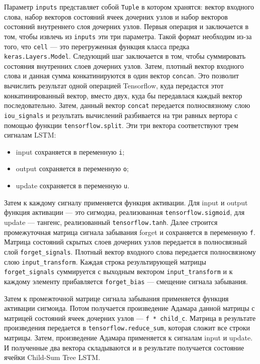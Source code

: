 Параметр \texttt{inputs} представляет собой \texttt{Tuple} в котором хранятся: вектор входного слова, набор векторов состояний ячеек дочерних узлов и набор векторов состояний внутреннего слоя дочерних узлов. Первыя операция и заключается в том, чтобы извлечь из \texttt{inputs} эти три параметра. Такой формат необходим из-за того, что \texttt{cell} --- это перегруженная функция класса предка \texttt{keras.Layers.Model}. Следующий шаг заключается в том, чтобы суммировать состояния внутренних слоев дочерних узлов. Затем, плотный вектор входного слова и данная сумма конкатинируются в один вектор \texttt{concan}. Это позволит вычислить результат одной операцией Tensorflow, куда передастся этот конкатинированный вектор, вместо двух, куда бы передавлася каждый вектор последовательно. Затем, данный вектор \texttt{concat} передается полносвязному слою \texttt{iou\_signals} и результать вычислений разбивается на три равных вертора с помощью функции \texttt{tensorflow.split}. Эти три вектора соответствуют трем сигналам LSTM\@:
\begin{itemize}
\item input сохраняется в переменную \texttt{i};
\item output сохраняется в переменную \texttt{o};
\item update сохраняется в переменную \texttt{u}.
\end{itemize}

Затем к каждому сигналу применяется функция активации. Для input и output функция активации --- это сигмодиа, реализованная \texttt{tensorflow.sig\-moid}, для update --- тангенс, реализованный \texttt{tensorflow.tanh}. Далее строится промежуточная матрица сигнала забывания forget и сохраняется в переменную \texttt{f}. Матрица состояний скрытых слоев дочерних узлов передается в полносвязный слой \texttt{forget\_signals}. Плотный вектор входного слова передается полносвязному слою \texttt{input\_transform}. Каждая строка результирующей матрицы \texttt{forget\_signals} суммируется с выходным вектором \texttt{input\_trans\-form} и к каждому элементу прибавляется \texttt{forget\_bias} --- смещение сигнала забывания.

Затем к промежточной матрице сигнала забывания применяется функция активации сигмоида. Потом получается произведение Адамара данной матрицы с матрицей состояний ячеек дочерних узлов --- \texttt{f * child\_c}. Матрица в результате произведения передается в \texttt{tensorflow.reduce\_sum}, которая сложит все строки матрицы. Затем, произведение Адамара применяется к сигналам input и update. И полученные два вектора складываются и в результате получается состояние ячейки Child-Sum Tree LSTM\@.

